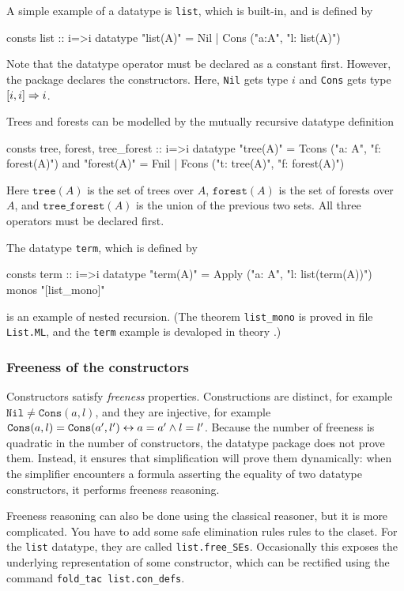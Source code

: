 A simple example of a datatype is \texttt{list}, which is built-in, and is
defined by
\begin{ttbox}
consts     list :: i=>i
datatype  "list(A)" = Nil | Cons ("a:A", "l: list(A)")
\end{ttbox}
Note that the datatype operator must be declared as a constant first.
However, the package declares the constructors.  Here, \texttt{Nil} gets type
$i$ and \texttt{Cons} gets type $[i,i]\Rightarrow i$.

Trees and forests can be modelled by the mutually recursive datatype
definition
\begin{ttbox}
consts     tree, forest, tree_forest :: i=>i
datatype  "tree(A)"   = Tcons ("a: A",  "f: forest(A)")
and       "forest(A)" = Fnil  |  Fcons ("t: tree(A)",  "f: forest(A)")
\end{ttbox}
Here $\texttt{tree}(A)$ is the set of trees over $A$, $\texttt{forest}(A)$ is
the set of forests over $A$, and  $\texttt{tree_forest}(A)$ is the union of
the previous two sets.  All three operators must be declared first.

The datatype \texttt{term}, which is defined by
\begin{ttbox}
consts     term :: i=>i
datatype  "term(A)" = Apply ("a: A", "l: list(term(A))")
  monos "[list_mono]"
\end{ttbox}
is an example of nested recursion.  (The theorem \texttt{list_mono} is proved
in file \texttt{List.ML}, and the \texttt{term} example is devaloped in theory
.)

\subsubsection{Freeness of the constructors}

Constructors satisfy {\em freeness} properties.  Constructions are distinct,
for example $\texttt{Nil}\not=\texttt{Cons}(a,l)$, and they are injective, for
example $\texttt{Cons}(a,l)=\texttt{Cons}(a',l') \leftrightarrow a=a' \wedge l=l'$.
Because the number of freeness is quadratic in the number of constructors, the
datatype package does not prove them.  Instead, it ensures that simplification
will prove them dynamically: when the simplifier encounters a formula
asserting the equality of two datatype constructors, it performs freeness
reasoning.  

Freeness reasoning can also be done using the classical reasoner, but it is
more complicated.  You have to add some safe elimination rules rules to the
claset.  For the \texttt{list} datatype, they are called
\texttt{list.free_SEs}.  Occasionally this exposes the underlying
representation of some constructor, which can be rectified using the command
\hbox{\tt fold_tac list.con_defs}.


